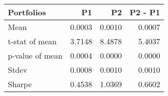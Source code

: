 \begin{tabular}{lrrr}
\toprule
Portfolios & P1 & P2 & P2 - P1 \\
\midrule
Mean & 0.0003 & 0.0010 & 0.0007 \\
t-stat of mean & 3.7148 & 8.4878 & 5.4037 \\
p-value of mean & 0.0004 & 0.0000 & 0.0000 \\
Stdev & 0.0008 & 0.0010 & 0.0010 \\
Sharpe & 0.4538 & 1.0369 & 0.6602 \\
\bottomrule
\end{tabular}
